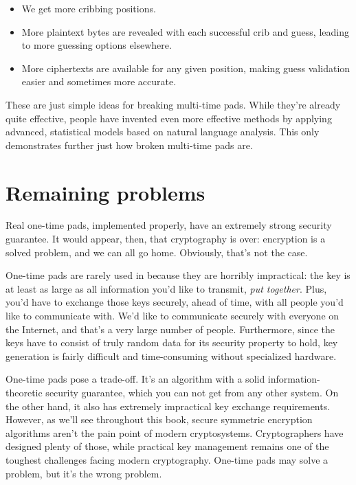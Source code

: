 \documentclass[11pt,ebook,table,dvipsnames]{memoir}
\begin{document}
\begin{itemize}
\item We get more cribbing positions.
\item More plaintext bytes are revealed with each successful crib and
guess, leading to more guessing options elsewhere.
\item More ciphertexts are available for any given position, making guess
validation easier and sometimes more accurate.
\end{itemize}

These are just simple ideas for breaking multi-time pads. While
they're already quite effective, people have invented even more
effective methods by applying advanced, statistical models based on
natural language analysis. This only demonstrates further just how
broken multi-time pads are. \cite{mason:nltwotimepads}
\section{Remaining problems}
\label{sec-2-1-6}

Real one-time pads, implemented properly, have an extremely strong
security guarantee. It would appear, then, that cryptography is over:
encryption is a solved problem, and we can all go home. Obviously,
that's not the case.

One-time pads are rarely used in because they are horribly
impractical: the key is at least as large as all information you'd
like to transmit, \emph{put together}. Plus, you'd have to exchange those
keys securely, ahead of time, with all people you'd like to
communicate with. We'd like to communicate securely with everyone on
the Internet, and that's a very large number of people. Furthermore,
since the keys have to consist of truly random data for its security
property to hold, key generation is fairly difficult and
time-consuming without specialized hardware.

One-time pads pose a trade-off. It's an algorithm with a solid
information-theoretic security guarantee, which you can not get from
any other system. On the other hand, it also has extremely impractical
key exchange requirements. However, as we'll see throughout this book,
secure symmetric encryption algorithms aren't the pain point of modern
cryptosystems. Cryptographers have designed plenty of those, while
practical key management remains one of the toughest challenges facing
modern cryptography. One-time pads may solve a problem, but it's the
wrong problem.
\end{document}
